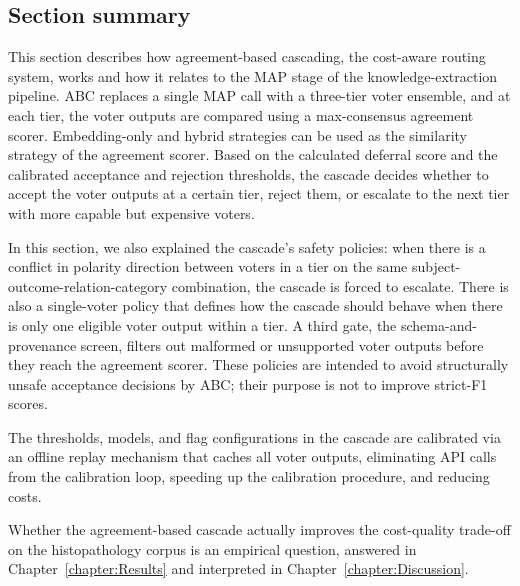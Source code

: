 \subsection{Section summary}\label{subsec:abc-section-summary}

This section describes how agreement-based cascading, the cost-aware routing system, works and how it relates to the MAP stage of the knowledge-extraction pipeline. ABC replaces a single MAP call with a three-tier voter ensemble, and at each tier, the voter outputs are compared using a max-consensus agreement scorer. Embedding-only and hybrid strategies can be used as the similarity strategy of the agreement scorer. Based on the calculated deferral score and the calibrated acceptance and rejection thresholds, the cascade decides whether to accept the voter outputs at a certain tier, reject them, or escalate to the next tier with more capable but expensive voters. 

In this section, we also explained the cascade's safety policies: when there is a conflict in polarity direction between voters in a tier on the same subject-outcome-relation-category combination, the cascade is forced to escalate. There is also a single-voter policy that defines how the cascade should behave when there is only one eligible voter output within a tier. A third gate, the schema-and-provenance screen, filters out malformed or unsupported voter outputs before they reach the agreement scorer. These policies are intended to avoid structurally unsafe acceptance decisions by ABC; their purpose is not to improve strict-F1 scores.

The thresholds, models, and flag configurations in the cascade are calibrated via an offline replay mechanism that caches all voter outputs, eliminating API calls from the calibration loop, speeding up the calibration procedure, and reducing costs. 

Whether the agreement-based cascade actually improves the cost-quality trade-off on the histopathology corpus is an empirical question, answered in Chapter~\ref{chapter:Results} and interpreted in Chapter~\ref{chapter:Discussion}.